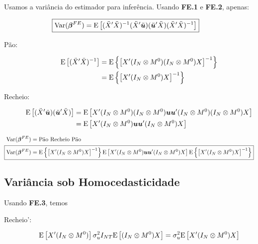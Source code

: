 \documentclass[11pt, oneside, a4paper, article]{article}
\numberwithin{equation}{section}
\begin{document}
\begin{description}
Usamos a variância do estimador para inferência.
Usando \textbf{FE.1} e \textbf{FE.2}, apenas:

\vspace{-1 em}
\begin{align*} 
	\Aboxed{
\Var( \mbs{\beta}^{FE} ) = 
\E \left[
( \ddot{X}' \ddot{X} )^{-1}
(\ddot{X}' \ddot{\mbs{u}}) (\ddot{\mbs{u}}' \ddot{X} )
( \ddot{X}' \ddot{X} )^{-1} 
\right]}
\end{align*}


\begin{description}
\item [Pão:]
\begin{align*}
\text{E}\left[ ( \ddot{X}' \ddot{X} )^{-1} \right] &=
\text{E} \left\{ \left[
X' ( I_{N} \otimes M^{0} ) ( I_{N} \otimes M^{0} ) X
\right]^{-1} \right\}
\\ &=
\text{E} \left\{ \left[
X' ( I_{N} \otimes M^{0} ) X
\right]^{-1} \right\}
\end{align*}

\item [Recheio:]
\begin{align*}
\text{E}\left[
(\ddot{X}' \ddot{\boldsymbol{u}}) (\ddot{\boldsymbol{u}}' \ddot{X} ) 
\right] 
&=
\text{E} \left[
X' ( I_{N} \otimes M^{0} ) ( I_{N} \otimes M^{0} ) 
\boldsymbol{u} \boldsymbol{u}'
( I_{N} \otimes M^{0} ) ( I_{N} \otimes M^{0} ) X
\right]
\\ &=
\text{E} \left[
X' ( I_{N} \otimes M^{0} ) \boldsymbol{u} \boldsymbol{u}' ( I_{N} \otimes M^{0} ) X
\right]
\end{align*}
\end{description}

\vspace{-1 em}
\begin{align*} 
\Var( \mbs{\beta}^{FE} ) &= \text{Pão Recheio Pão}
\\ 
\Aboxed{
\Var( \mbs{\beta}^{FE} ) &= 
\E \left\{ \left[
X' ( I_{N} \otimes M^{0} ) X
\right]^{-1} \right\}
\E \left[
X' ( I_{N} \otimes M^{0} ) \mbs{u} \mbs{u}' ( I_{N} \otimes M^{0} ) X
\right]
\E \left\{ \left[
X' ( I_{N} \otimes M^{0} ) X
\right]^{-1} \right\}
}
\end{align*}

\subsection*{Variância sob Homocedasticidade}

Usando \textbf{FE.3}, temos

\begin{description}
\item [Recheio':]
\begin{align*}
\text{E} \left[ X' ( I_{N} \otimes M^{0} ) \right]
\sigma^2_{u} I_{NT}
\text{E} \left[ ( I_{N} \otimes M^{0} ) X \right]
=
\sigma^2_{u}
\text{E} \left[ X' ( I_{N} \otimes M^{0} ) X \right]
\end{align*}
\end{description}


\end{description}
\end{document}
